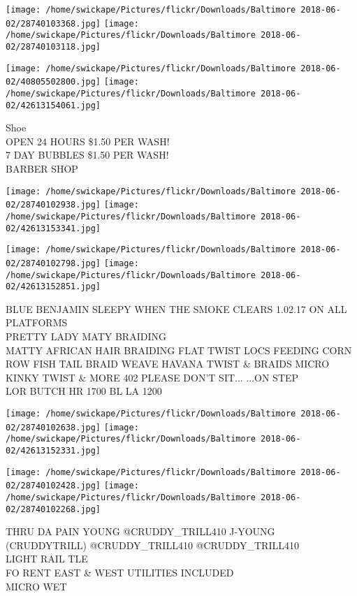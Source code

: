 \documentclass[10pt,letterpaper]{article}
\begin{document}
\texttt{[image: /home/swickape/Pictures/flickr/Downloads/Baltimore 2018-06-02/28740103368.jpg]}
\texttt{[image: /home/swickape/Pictures/flickr/Downloads/Baltimore 2018-06-02/28740103118.jpg]}

\texttt{[image: /home/swickape/Pictures/flickr/Downloads/Baltimore 2018-06-02/40805502800.jpg]}
\texttt{[image: /home/swickape/Pictures/flickr/Downloads/Baltimore 2018-06-02/42613154061.jpg]}

Shoe\\
OPEN 24 HOURS \$1.50 PER WASH!\\
7 DAY BUBBLES \$1.50 PER WASH!\\
BARBER SHOP\\
\pagebreak

\texttt{[image: /home/swickape/Pictures/flickr/Downloads/Baltimore 2018-06-02/28740102938.jpg]}
\texttt{[image: /home/swickape/Pictures/flickr/Downloads/Baltimore 2018-06-02/42613153341.jpg]}

\texttt{[image: /home/swickape/Pictures/flickr/Downloads/Baltimore 2018-06-02/28740102798.jpg]}
\texttt{[image: /home/swickape/Pictures/flickr/Downloads/Baltimore 2018-06-02/42613152851.jpg]}

BLUE BENJAMIN SLEEPY WHEN THE SMOKE CLEARS 1.02.17 ON ALL PLATFORMS\\
PRETTY LADY MATY BRAIDING\\
MATTY AFRICAN HAIR BRAIDING FLAT TWIST LOCS FEEDING CORN ROW FISH TAIL BRAID WEAVE HAVANA TWIST \& BRAIDS MICRO KINKY TWIST \& MORE 402 PLEASE DON'T SIT... ...ON STEP\\
LOR BUTCH HR 1700 BL LA 1200\\
\pagebreak

\texttt{[image: /home/swickape/Pictures/flickr/Downloads/Baltimore 2018-06-02/28740102638.jpg]}
\texttt{[image: /home/swickape/Pictures/flickr/Downloads/Baltimore 2018-06-02/42613152331.jpg]}

\texttt{[image: /home/swickape/Pictures/flickr/Downloads/Baltimore 2018-06-02/28740102428.jpg]}
\texttt{[image: /home/swickape/Pictures/flickr/Downloads/Baltimore 2018-06-02/28740102268.jpg]}

THRU DA PAIN YOUNG @CRUDDY\_TRILL410 J{-}YOUNG (CRUDDYTRILL) @CRUDDY\_TRILL410 @CRUDDY\_TRILL410\\
LIGHT RAIL TLE\\
FO RENT EAST \& WEST UTILITIES INCLUDED\\
MICRO WET\\
\pagebreak
\end{document}
